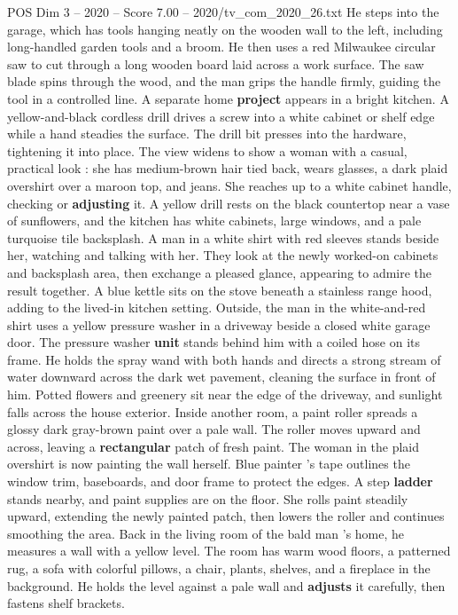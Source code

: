 \begin{textsample}{POS Dim 3 – 2020 – Score 7.00 – 2020/tv\_com\_2020\_26.txt}
He steps into the garage, which has tools hanging neatly on the wooden wall to the left, including long-handled garden tools and a broom.
He then uses a red Milwaukee circular saw to cut through a long wooden board laid across a work surface.
The saw blade spins through the wood, and the man grips the handle firmly, guiding the tool in a controlled line.
A separate home \textbf{project} appears in a bright kitchen.
A yellow-and-black cordless drill drives a screw into a white cabinet or shelf edge while a hand steadies the surface.
The drill bit presses into the hardware, tightening it into place.
The view widens to show a woman with a casual, practical look : she has medium-brown hair tied back, wears glasses, a dark plaid overshirt over a maroon top, and jeans.
She reaches up to a white cabinet handle, checking or \textbf{adjusting} it.
A yellow drill rests on the black countertop near a vase of sunflowers, and the kitchen has white cabinets, large windows, and a pale turquoise tile backsplash.
A man in a white shirt with red sleeves stands beside her, watching and talking with her.
They look at the newly worked-on cabinets and backsplash area, then exchange a pleased glance, appearing to admire the result together.
A blue kettle sits on the stove beneath a stainless range hood, adding to the lived-in kitchen setting.
Outside, the man in the white-and-red shirt uses a yellow pressure washer in a driveway beside a closed white garage door.
The pressure washer \textbf{unit} stands behind him with a coiled hose on its frame.
He holds the spray wand with both hands and directs a strong stream of water downward across the dark wet pavement, cleaning the surface in front of him.
Potted flowers and greenery sit near the edge of the driveway, and sunlight falls across the house exterior.
Inside another room, a paint roller spreads a glossy dark gray-brown paint over a pale wall.
The roller moves upward and across, leaving a \textbf{rectangular} patch of fresh paint.
The woman in the plaid overshirt is now painting the wall herself.
Blue painter ’s tape outlines the window trim, baseboards, and door frame to protect the edges.
A step \textbf{ladder} stands nearby, and paint supplies are on the floor.
She rolls paint steadily upward, extending the newly painted patch, then lowers the roller and continues smoothing the area.
Back in the living room of the bald man ’s home, he measures a wall with a yellow level.
The room has warm wood floors, a patterned rug, a sofa with colorful pillows, a chair, plants, shelves, and a fireplace in the background.
He holds the level against a pale wall and \textbf{adjusts} it carefully, then fastens shelf brackets.

\end{textsample}
